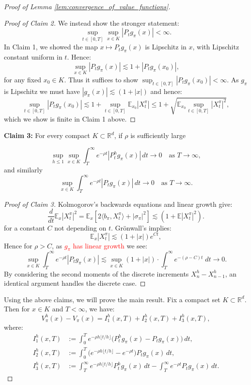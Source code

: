 \documentclass[11pt,oneside,reqno]{article}
\theoremstyle{plain}
\theoremstyle{definition}
\numberwithin{equation}{section}
\renewcommand{\leq}{\leqslant}
\newcommand{\R}{\mathbb{R}}
\newcommand{\E}{\mathbb{E}}
\newcommand{\red}{\textcolor{red}}
\begin{document}
\begin{proof}[Proof of Lemma \ref{lem:convergence_of_value_functions}]
	\begin{proof}[Proof of Claim 2]
		We instead show the stronger statement:
		\[\sup_{t \in [0, T]} \sup_{x \in K} |P_t g_\pi(x)| < \infty.\]
		In Claim 1, we showed the map $x \mapsto P_tg_\pi(x)$ is Lipschitz in $x$, with Lipschitz constant
		uniform in $t$. Hence:
		\[\sup_{x \in K} |P_t g_\pi(x)| \lesssim 1 + |P_t g_\pi(x_0)|,\]
		\noindent for any fixed $x_0 \in K$. Thus it suffices to show $\sup_{t \in [0,T]} |P_t g_\pi(x_0)| < \infty$. As $g_\pi$ is Lipschitz
		we must have $|g_\pi(x)| \lesssim (1 + |x|)$ and hence:
		\[\sup_{t \in [0,T]} |P_t g_\pi(x_0)| \lesssim 1 + \sup_{t\in [0,T]} \E_{x_0}|X^\pi_t| \leq 1 + \sqrt{\E_{x_0}\sup_{t\in [0,T]} |X^\pi_t|^2}, \]
		\noindent which we show is finite in Claim 1 above.
	\end{proof}

	\noindent \textbf{Claim 3:} For every compact $K\subset \R^d$, if $\rho$ is sufficiently large

			\[
		\sup_{h\le 1}\sup_{x\in K}
		\int_T^\infty e^{-\rho t}|P_t^h g_\pi(x)|\,dt \to 0
		\quad \text{as } T\to\infty,
		\]
		and similarly
		\[
		\sup_{x\in K}
		\int_T^\infty e^{-\rho t}|P_t g_\pi(x)|\,dt \to 0
		\quad \text{as } T\to\infty.
		\]

	
	
	\begin{proof}[Proof of Claim 3]
		Kolmogorov's backwards equations and linear growth give:
		\[\frac{d}{dt}\E_x |X^\pi_t|^2 = \E_x \left[2 \langle b_\pi, X^\pi_t\rangle + |\sigma_\pi|^2 \right] \lesssim (1 + \E|X_t^\pi|^2).\]
		for a constant $C$ not depending on $t$. Gr\"onwall's implies:
		\[\E_x |X^\pi_t| \lesssim \left(1 + |x|\right) e^{Ct},\]
		\noindent Hence for $\rho > C$, as \red{$g_\pi$ has linear growth} we see:
		\[\sup_{x \in K}\int_T^\infty e^{-\rho t} |P_t g_\pi(x)| \lesssim \sup_{x \in K} (1 + |x|) \cdot \int_T^\infty e^{-(\rho - C) t} \; dt \to 0.\]
		By considering the second moments of the discrete increments $X^h_n - X^h_{n-1}$, an identical argument handles the discrete case. 
	\end{proof}

	\noindent Using the above claims, we will prove the main result. Fix a compact set $K\subset \R^d$. Then for $x\in K$ and $T<\infty$, we have:
\[
V_\pi^h(x)-V_\pi(x)=I_1^h(x,T)+I_2^h(x,T)+I_3^h(x,T),
\]
where:
\begin{align*}
I_1^h(x,T)
&:=
\int_0^T e^{-\rho h\lfloor t/h\rfloor}\big(P_t^h g_\pi(x)-P_t g_\pi(x)\big)\,dt, \\
I_2^h(x,T)
&:=
\int_0^T \big(e^{-\rho h\lfloor t/h\rfloor}-e^{-\rho t}\big)P_t g_\pi(x)\,dt, \\
I_3^h(x,T)
&:=
\int_T^\infty e^{-\rho h\lfloor t/h\rfloor}P_t^h g_\pi(x)\,dt
-
\int_T^\infty e^{-\rho t}P_t g_\pi(x)\,dt.
\end{align*}


\end{proof}
\end{document}
